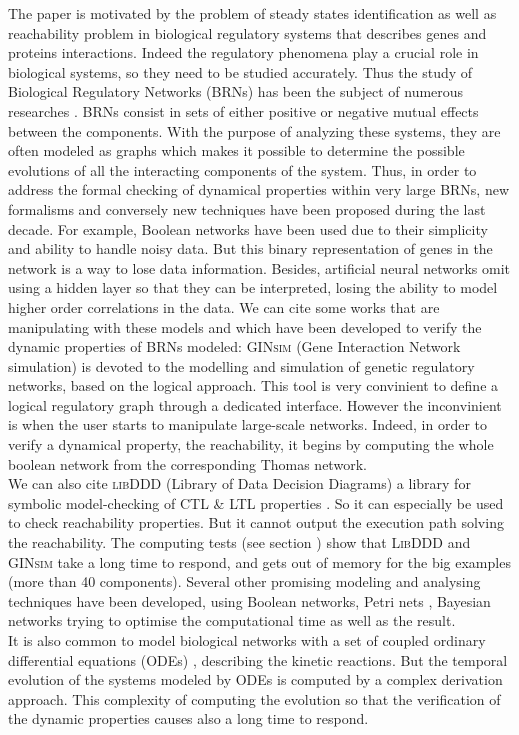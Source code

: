 The paper is motivated by the problem of steady states identification as well as reachability problem in biological regulatory systems that describes genes and proteins interactions. Indeed the regulatory phenomena play a crucial role in biological systems, so they need to be studied accurately. Thus the study of Biological Regulatory Networks (BRNs) has been the subject of numerous researches \cite{thieffry1999modularity, shermin20092, rauf2011formal}. BRNs consist in sets of either positive or negative mutual effects between the components. With the purpose of analyzing these systems, they are often modeled as graphs which makes it possible to determine the possible evolutions of all the interacting components of the system. Thus, in order to address the formal checking of dynamical properties within very large BRNs, new formalisms and conversely new techniques have been proposed during the last decade. For example, Boolean networks \cite{stuart1993origins, kauffman1969metabolic} have been used due to their simplicity and ability to handle noisy data. But this binary representation of genes in the network is a way to lose data information. Besides, artificial neural networks omit using a hidden layer so that they can be interpreted, losing the ability to model higher order correlations in the data. We can cite some works that are manipulating with these models and which have been developed to verify the dynamic properties of BRNs modeled: \textsc{GINsim} (Gene Interaction Network simulation) \cite{chaouiya2012logical, gonzalez2006ginsim} is devoted to the modelling and simulation of genetic regulatory networks, based on the logical approach. This tool is very convinient  to define a logical regulatory graph through a dedicated interface. However the inconvinient is when the user starts to manipulate large-scale networks. Indeed, in order to verify a dynamical property, the reachability, it begins by computing the whole boolean network from the corresponding Thomas network. \\ 
We can also cite \textsc{libDDD} (Library of Data Decision Diagrams) a library for symbolic model-checking of CTL \& LTL properties \cite{libddd, Kordon09libddd}. So it can especially be used to check reachability properties. But it cannot output the execution path solving the reachability. The computing tests (see section ) show that \textsc{LibDDD} and \textsc{GINsim} take a long time to respond, and gets out of memory for the big examples (more than 40 components).  %
Several other promising modeling and analysing techniques have been developed, using Boolean networks, Petri nets \cite{heljanko2001answer}, Bayesian networks \cite{numata2008partial} trying to optimise the computational time as well as the result.\\ %
It is also common to model biological networks with a set of coupled ordinary differential equations (ODEs) \cite{chu2009models}, describing the kinetic reactions. But the temporal evolution of the systems modeled by ODEs is computed by a complex derivation approach. This complexity of computing the evolution so that the verification of the dynamic properties causes also a long time to respond. 


